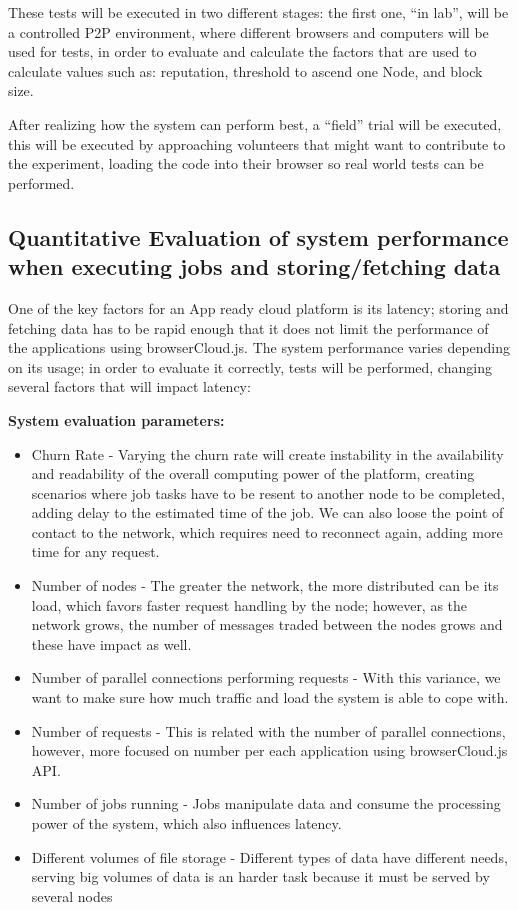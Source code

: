 These tests will be executed in two different stages: the first one, ``in lab'', will be a controlled P2P environment, where different browsers and computers will be used for tests, in order to evaluate and calculate the factors that are used to calculate values such as: reputation, threshold to ascend one Node, and block size. 

After realizing how the system can perform best, a ``field'' trial will be executed, this will be executed by approaching volunteers that might want to contribute to the experiment, loading the code into their browser so real world tests can be performed.

\subsection{Quantitative Evaluation of system performance when executing jobs and storing/fetching data}

One of the key factors for an App ready cloud platform is its latency; storing and fetching data has to be rapid enough that it does not limit the performance of the applications using browserCloud.js. The system performance varies depending on its usage; in order to evaluate it correctly, tests will be performed, changing several factors that will impact latency:

\textbf{System evaluation parameters:}
\begin{itemize}
  \item Churn Rate - Varying the churn rate will create instability in the availability and readability of the overall computing power of the platform, creating scenarios where job tasks have to be resent to another node to be completed, adding delay to the estimated time of the job. We can also loose the point of contact to the network, which requires need to reconnect again, adding more time for any request.
  \item Number of nodes - The greater the network, the more distributed can be its load, which favors faster request handling by the node; however, as the network grows, the number of messages traded between the nodes grows and these have impact as well. 
  \item Number of parallel connections performing requests - With this variance, we want to make sure how much traffic and load the system is able to cope with.
  \item Number of requests - This is related with the number of parallel connections, however, more focused on number per each application using browserCloud.js API.
  \item Number of jobs running - Jobs manipulate data and consume the processing power of the system, which also influences latency.
  \item Different volumes of file storage - Different types of data have different needs, serving big volumes of data is an harder task because it must be served by several nodes
\end{itemize}

